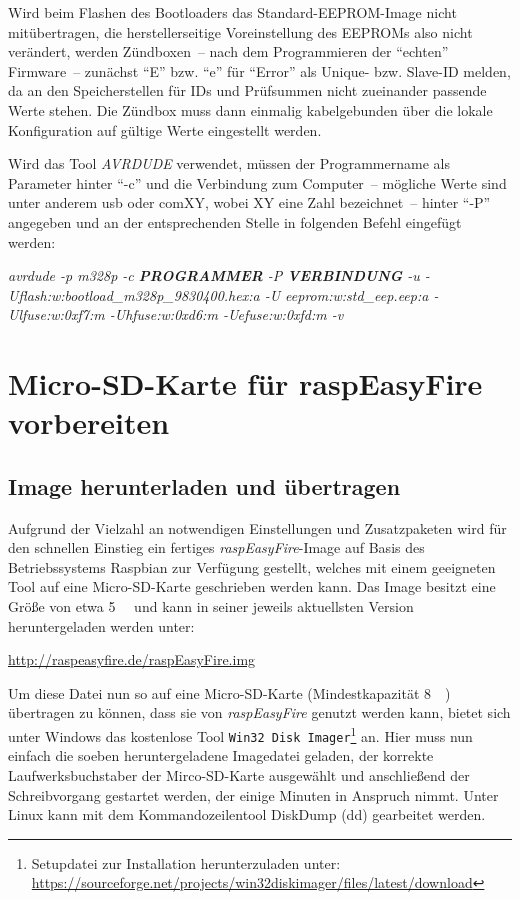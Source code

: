 \documentclass[paper=a4, parskip, numbers=noenddot, toc=listof, headsepline]{scrbook}
\newcommand{\REF}{\emph{raspEasyFire}}
\begin{document}
			Wird beim Flashen des Bootloaders das Standard-EEPROM-Image nicht mitübertragen, die herstellerseitige Voreinstellung des EEPROMs also nicht verändert, werden Zündboxen~-- nach dem Programmieren der \enquote{echten} Firmware~-- zunächst \enquote{E} bzw. \enquote{e} für \enquote{Error} als Unique- bzw. Slave-ID melden, da an den Speicherstellen für IDs und Prüfsummen nicht zueinander passende Werte stehen. Die Zündbox muss dann einmalig kabelgebunden über die lokale Konfiguration auf gültige Werte eingestellt werden.
			
			Wird das Tool \emph{AVRDUDE} verwendet, müssen der Programmername als Parameter hinter \enquote{-c} und die Verbindung zum Computer~-- mögliche Werte sind unter anderem usb oder comXY, wobei XY eine Zahl bezeichnet~-- hinter \enquote{-P} angegeben und an der entsprechenden Stelle in folgenden Befehl eingefügt werden:
			
			\begin{center}
				\emph{avrdude -p m328p -c \textbf{PROGRAMMER} -P \textbf{VERBINDUNG} -u -Uflash:w:bootload\_m328p\_9830400.hex:a -U eeprom:w:std\_eep.eep:a -Ulfuse:w:0xf7:m -Uhfuse:w:0xd6:m -Uefuse:w:0xfd:m -v}
			\end{center}


	\chapter{Micro-SD-Karte für raspEasyFire vorbereiten}
		\label{ch:raspisd}

		\section{Image herunterladen und übertragen}
			Aufgrund der Vielzahl an notwendigen Einstellungen und Zusatzpaketen wird für den schnellen Einstieg ein fertiges {\REF}-Image auf Basis des Betriebssystems Raspbian zur Verfügung gestellt, welches mit einem geeigneten Tool auf eine Micro-SD-Karte geschrieben werden kann. Das Image besitzt eine Größe von etwa \SI{5}{\giga\byte} und kann in seiner jeweils aktuellsten Version heruntergeladen werden unter:
			\begin{center}
				\url{http://raspeasyfire.de/raspEasyFire.img}
			\end{center}

			Um diese Datei nun so auf eine Micro-SD-Karte (Mindestkapazität \SI{8}{\giga\byte}) übertragen zu können, dass sie von {\REF} genutzt werden kann, bietet sich unter Windows das kostenlose Tool \texttt{Win32 Disk Imager}\footnote{Setupdatei zur Installation herunterzuladen unter: \url{https://sourceforge.net/projects/win32diskimager/files/latest/download}} an. Hier muss nun einfach die soeben heruntergeladene Imagedatei geladen, der korrekte Laufwerksbuchstaber der Mirco-SD-Karte ausgewählt und anschließend der Schreibvorgang gestartet werden, der einige Minuten in Anspruch nimmt. Unter Linux kann mit dem Kommandozeilentool DiskDump (dd) gearbeitet werden.
			
\end{document}
